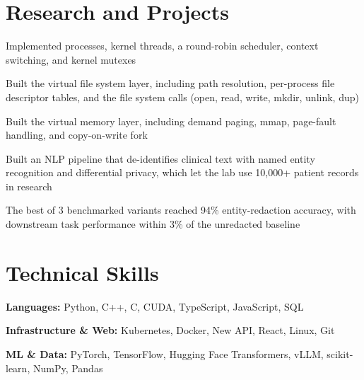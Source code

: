 \documentclass[10pt]{article}
\renewcommand{\skill}[2]{{\fontsize{9.3}{11.2}\selectfont\textbf{#1:} #2\par}\vspace{1.5pt}}
\begin{document}
\section{Research and Projects}
\begin{bullets}
  \item Implemented processes, kernel threads, a round-robin scheduler, context switching, and kernel mutexes
  \item Built the virtual file system layer, including path resolution, per-process file descriptor tables, and the file system calls (open, read, write, mkdir, unlink, dup)
  \item Built the virtual memory layer, including demand paging, mmap, page-fault handling, and copy-on-write fork
\end{bullets}

\begin{bullets}
  \item Built an NLP pipeline that de-identifies clinical text with named entity recognition and differential privacy, which let the lab use 10,000+ patient records in research
  \item The best of 3 benchmarked variants reached 94\% entity-redaction accuracy, with downstream task performance within 3\% of the unredacted baseline
\end{bullets}

\section{Technical Skills}
\skill{Languages}{Python, C++, C, CUDA, TypeScript, JavaScript, SQL}
\skill{Infrastructure \& Web}{Kubernetes, Docker, New API, React, Linux, Git}
\skill{ML \& Data}{PyTorch, TensorFlow, Hugging Face Transformers, vLLM, scikit-learn, NumPy, Pandas}
\end{document}
